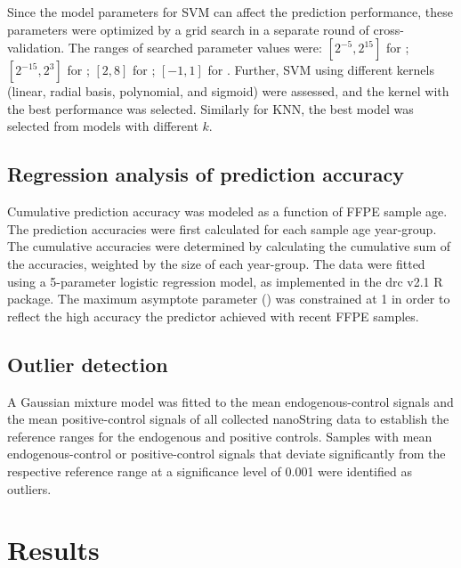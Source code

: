 Since the model parameters for SVM can affect the prediction performance, these parameters were optimized by a grid search in a separate round of cross-validation. The ranges of searched parameter values were: $[2^{-5}, 2^{15}]$ for ; $[2^{-15}, 2^3]$ for ; $[2, 8]$ for ; $[-1, 1]$ for . Further, SVM using different kernels (linear, radial basis, polynomial, and sigmoid) were assessed, and the kernel with the best performance was selected. Similarly for KNN, the best model was selected from models with different $k$.

\subsection{Regression analysis of prediction accuracy}

Cumulative prediction accuracy was modeled as a function of FFPE sample age. The prediction accuracies were first calculated for each sample age year-group. The cumulative accuracies were determined by calculating the cumulative sum of the accuracies, weighted by the size of each year-group. The data were fitted using a 5-parameter logistic regression model, as implemented in the drc v2.1 R package. The maximum asymptote parameter () was constrained at 1 in order to reflect the high accuracy the predictor achieved with recent FFPE samples.

\subsection{Outlier detection}

A Gaussian mixture model was fitted to the mean endogenous-control signals and the mean positive-control signals of all collected nanoString data to establish the reference ranges for the endogenous and positive controls. Samples with mean endogenous-control or positive-control signals that deviate significantly from the respective reference range at a significance level of 0.001 were identified as outliers.

\section{Results}

